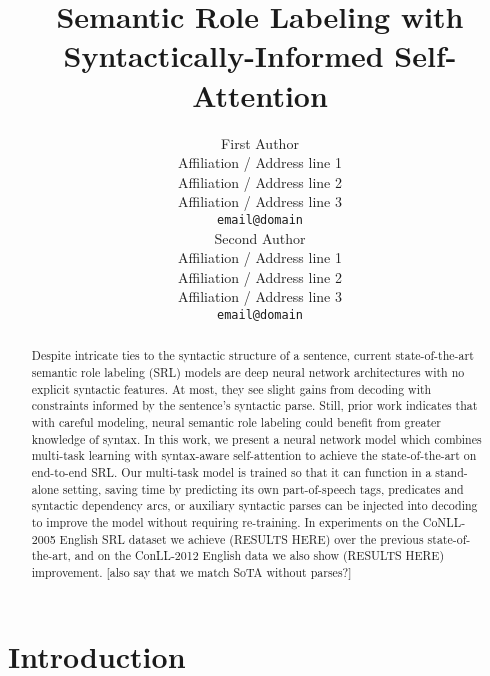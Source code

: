 \documentclass[11pt,a4paper]{article}
\title{Semantic Role Labeling with Syntactically-Informed Self-Attention}
\author{First Author \\
  Affiliation / Address line 1 \\
  Affiliation / Address line 2 \\
  Affiliation / Address line 3 \\
  {\tt email@domain} \\\And
  Second Author \\
  Affiliation / Address line 1 \\
  Affiliation / Address line 2 \\
  Affiliation / Address line 3 \\
  {\tt email@domain} \\}
\date{}
\begin{document}
\maketitle
\begin{abstract}
Despite intricate ties to the syntactic structure of a sentence, current state-of-the-art semantic role labeling (SRL) models are deep neural network architectures with no explicit syntactic features. At most, they see slight gains from decoding with constraints informed by the sentence's syntactic parse. Still, prior work indicates that with careful modeling, neural semantic role labeling could benefit from greater knowledge of syntax. In this work, we present a neural network model which combines multi-task learning with syntax-aware self-attention to achieve the state-of-the-art on end-to-end SRL. Our multi-task model is trained so that it can function in a stand-alone setting, saving time by predicting its own part-of-speech tags, predicates and syntactic dependency arcs, or auxiliary syntactic parses can be injected into decoding to improve the model without requiring re-training. In experiments on the CoNLL-2005 English SRL dataset we achieve (RESULTS HERE) over the previous state-of-the-art, and on the ConLL-2012 English data we also show (RESULTS HERE) improvement. [also say that we match SoTA without parses?]
\end{abstract}

\section{Introduction}
\end{document}
